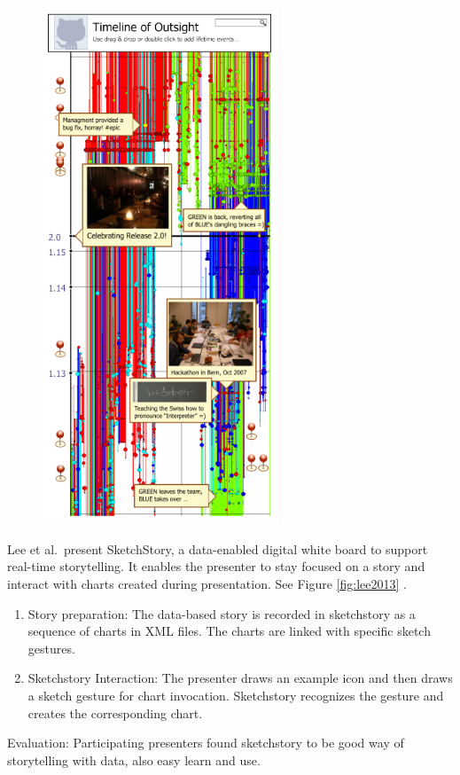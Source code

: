 \documentclass{egpubl}
\begin{document}
\begin{figure}
\begingroup
\centering
\includegraphics[width=7cm]{./images/kuhn2012}
\label{fig:kuhn2012}
\endgroup
\end{figure}




%
Lee et al.\ present SketchStory, a data-enabled digital white board to support real-time storytelling. It enables the presenter to stay focused on a story and interact with charts created during presentation. See Figure \ref{fig:lee2013} \cite{lee2013}.
\begin{enumerate}
\item Story preparation: The data-based story is recorded in sketchstory as a sequence of charts in XML files. The charts are linked with specific sketch gestures.
\item Sketchstory Interaction: The presenter draws an example icon and then draws a sketch gesture for chart invocation. Sketchstory recognizes the gesture and creates the corresponding chart.
\end{enumerate}
Evaluation: Participating presenters found sketchstory to be good way of storytelling with data, also easy learn and use.
\end{document}
